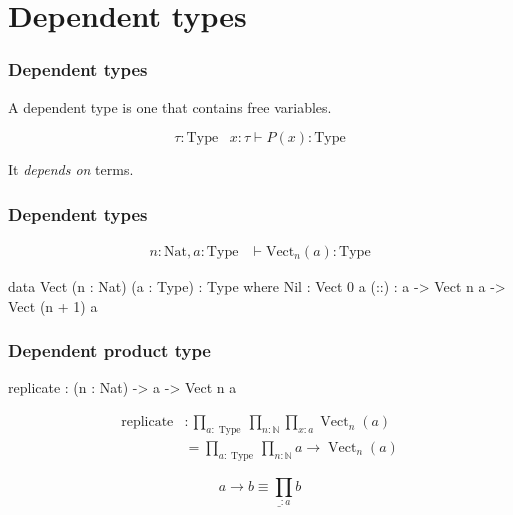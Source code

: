 \documentclass[
  xcolor={usenames,dvipsnames,svgnames},
  ]{beamer}
\DeclareMathOperator{\Vect}{Vect}
\DeclareMathOperator{\Type}{Type}
\begin{document}
\section{Dependent types}

\begin{frame}
\frametitle{Dependent types}
A dependent type is one that contains free variables.

\[
  \tau : \mathrm{Type} \;\;\; x: \tau \vdash P(x) : \mathrm{Type}  
\]

It \textit{depends on} terms.

\end{frame}



\begin{frame}[fragile]
\frametitle{Dependent types}

\begin{align*}
  n: \mathrm{Nat}, a : \mathrm{Type} & \vdash \mathrm{Vect}_n(a) : \mathrm{Type}
\end{align*}

\begin{code}
  data Vect (n : Nat) (a : Type) : Type where
    Nil  : Vect 0 a
    (::) : a -> Vect n a -> Vect (n + 1) a
\end{code}

\end{frame}

\begin{frame}[fragile]
\frametitle{Dependent product type}

\begin{code}
  replicate : (n : Nat) -> a -> Vect n a
\end{code}

\begin{align*}
  \operatorname{replicate} &: \prod_{a : \Type} \prod_{n : \mathbb{N}} \prod_{x : a} \Vect_n(a) \\
   &=  \prod_{a : \Type} \prod_{n : \mathbb{N}} a \to \Vect_n(a)
\end{align*}

  \[
    a \to b \equiv \prod_{\_ : a} b
  \]
\end{frame}
\end{document}
